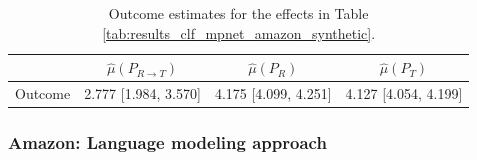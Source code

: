 \documentclass{article}
\begin{document}
\begin{table}[!ht]
    \centering
    \begin{tabular}{c|ccc}
    \toprule
     & $\hat{\mu}(P_{R \rightarrow T})$   & $\hat{\mu}(P_R)$     & $\hat{\mu}(P_T)$     \\
\midrule
    Outcome & 2.777 [1.984, 3.570]               & 4.175 [4.099, 4.251] & 4.127 [4.054, 4.199] \\
\bottomrule
    \end{tabular}
    \caption{Outcome estimates for the effects in Table \ref{tab:results_clf_mpnet_amazon_synthetic}.}
    \label{tab:results_clf_mpnet_amazon_synthetic_outcome}
\end{table}

\subsubsection{Amazon: Language modeling approach}
\end{document}
